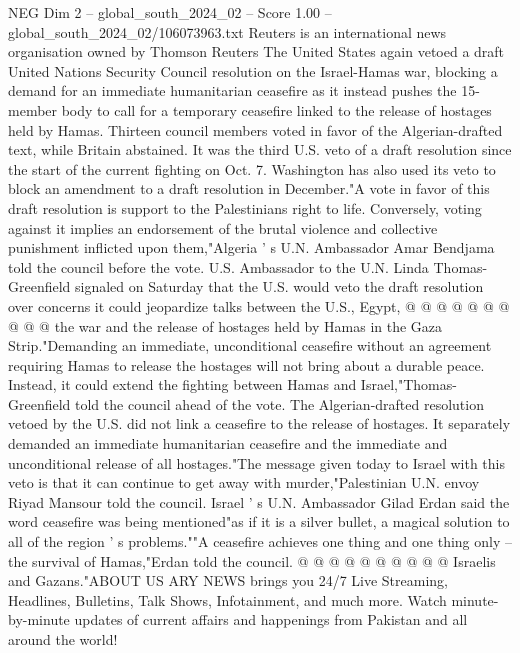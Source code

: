 \begin{textsample}{NEG Dim 2 – global\_south\_2024\_02 – Score 1.00 – global\_south\_2024\_02/106073963.txt}  \label{ex:f2_neg_410}
Reuters is an international news organisation owned by Thomson Reuters The United States again vetoed a draft United Nations Security Council resolution on the Israel-Hamas war, blocking a demand for an immediate humanitarian ceasefire as it instead pushes the 15-member body to call for a temporary ceasefire linked to the release of hostages held by Hamas.
Thirteen council members voted in favor of the Algerian-drafted text, while Britain abstained.
It was the third U.S. veto of a draft resolution since the start of the current fighting on Oct. 7.
Washington has also used its veto to block an amendment to a draft resolution in December."A vote in favor of this draft resolution is support to the Palestinians right to life.
Conversely, voting against it implies an endorsement of the brutal violence and collective punishment inflicted upon them,"Algeria ' s U.N.
Ambassador Amar Bendjama told the council before the vote.
U.S.
Ambassador to the U.N.
Linda Thomas-Greenfield signaled on Saturday that the U.S. would veto the draft resolution over concerns it could jeopardize talks between the U.S., Egypt, @ @ @ @ @ @ @ @ @ @ the war and the release of hostages held by Hamas in the Gaza Strip."Demanding an immediate, unconditional ceasefire without an agreement requiring Hamas to release the hostages will not bring about a durable peace.
Instead, it could extend the fighting between Hamas and Israel,"Thomas-Greenfield told the council ahead of the vote.
The Algerian-drafted resolution vetoed by the U.S. did not link a ceasefire to the release of hostages.
It separately demanded an immediate humanitarian ceasefire and the immediate and unconditional release of all hostages."The message given today to Israel with this veto is that it can continue to get away with murder,"Palestinian U.N. envoy Riyad Mansour told the council.
Israel ' s U.N.
Ambassador Gilad Erdan said the word ceasefire was being mentioned"as if it is a silver bullet, a magical solution to all of the region ' s problems.""A ceasefire achieves one thing and one thing only -- the survival of Hamas,"Erdan told the council. @ @ @ @ @ @ @ @ @ @ Israelis and Gazans."ABOUT US ARY NEWS brings you 24/7 Live Streaming, Headlines, Bulletins, Talk Shows, Infotainment, and much more.
Watch minute-by-minute updates of current affairs and happenings from Pakistan and all around the world!

\end{textsample}

